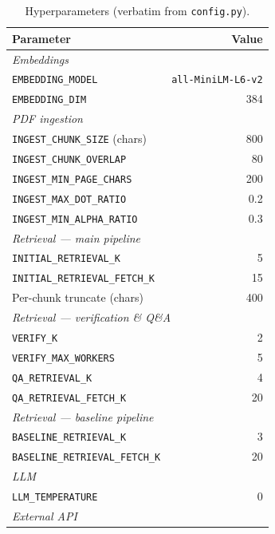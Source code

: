 \documentclass{article}
\begin{document}
\begin{table}[H]
\centering
\caption{Hyperparameters (verbatim from \texttt{config.py}).}
\label{tab:hyperparams}
\small
\begin{tabular}{lr}
\toprule
\textbf{Parameter} & \textbf{Value} \\
\midrule
\multicolumn{2}{l}{\textit{Embeddings}} \\
\quad \texttt{EMBEDDING\_MODEL}             & \texttt{all-MiniLM-L6-v2} \\
\quad \texttt{EMBEDDING\_DIM}               & 384 \\
\midrule
\multicolumn{2}{l}{\textit{PDF ingestion}} \\
\quad \texttt{INGEST\_CHUNK\_SIZE} (chars)  & 800 \\
\quad \texttt{INGEST\_CHUNK\_OVERLAP}       & 80 \\
\quad \texttt{INGEST\_MIN\_PAGE\_CHARS}     & 200 \\
\quad \texttt{INGEST\_MAX\_DOT\_RATIO}      & 0.2 \\
\quad \texttt{INGEST\_MIN\_ALPHA\_RATIO}    & 0.3 \\
\midrule
\multicolumn{2}{l}{\textit{Retrieval --- main pipeline}} \\
\quad \texttt{INITIAL\_RETRIEVAL\_K}        & 5 \\
\quad \texttt{INITIAL\_RETRIEVAL\_FETCH\_K} & 15 \\
\quad Per-chunk truncate (chars)             & 400 \\
\midrule
\multicolumn{2}{l}{\textit{Retrieval --- verification \& Q\&A}} \\
\quad \texttt{VERIFY\_K}                    & 2 \\
\quad \texttt{VERIFY\_MAX\_WORKERS}         & 5 \\
\quad \texttt{QA\_RETRIEVAL\_K}             & 4 \\
\quad \texttt{QA\_RETRIEVAL\_FETCH\_K}      & 20 \\
\midrule
\multicolumn{2}{l}{\textit{Retrieval --- baseline pipeline}} \\
\quad \texttt{BASELINE\_RETRIEVAL\_K}       & 3 \\
\quad \texttt{BASELINE\_RETRIEVAL\_FETCH\_K}& 20 \\
\midrule
\multicolumn{2}{l}{\textit{LLM}} \\
\quad \texttt{LLM\_TEMPERATURE}             & 0 \\
\midrule
\multicolumn{2}{l}{\textit{External API}} \\

\end{tabular}
\end{table}
\end{document}
